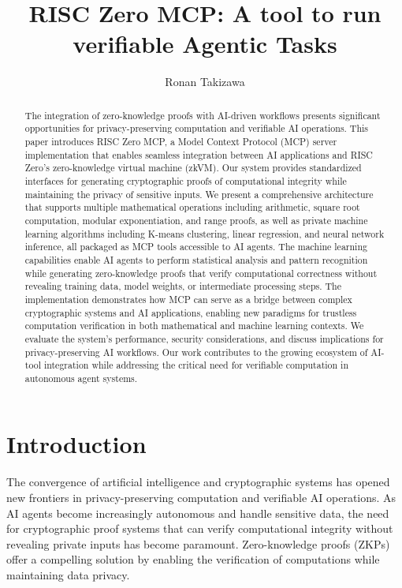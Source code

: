 \documentclass[11pt]{article}
\begin{document}
\title{RISC Zero MCP: A tool to run verifiable Agentic Tasks}

\author{Ronan Takizawa}


\maketitle

\begin{abstract}
The integration of zero-knowledge proofs with AI-driven workflows presents significant opportunities for privacy-preserving computation and verifiable AI operations. This paper introduces RISC Zero MCP, a Model Context Protocol (MCP) server implementation that enables seamless integration between AI applications and RISC Zero's zero-knowledge virtual machine (zkVM). Our system provides standardized interfaces for generating cryptographic proofs of computational integrity while maintaining the privacy of sensitive inputs. We present a comprehensive architecture that supports multiple mathematical operations including arithmetic, square root computation, modular exponentiation, and range proofs, as well as private machine learning algorithms including K-means clustering, linear regression, and neural network inference, all packaged as MCP tools accessible to AI agents. The machine learning capabilities enable AI agents to perform statistical analysis and pattern recognition while generating zero-knowledge proofs that verify computational correctness without revealing training data, model weights, or intermediate processing steps. The implementation demonstrates how MCP can serve as a bridge between complex cryptographic systems and AI applications, enabling new paradigms for trustless computation verification in both mathematical and machine learning contexts. We evaluate the system's performance, security considerations, and discuss implications for privacy-preserving AI workflows. Our work contributes to the growing ecosystem of AI-tool integration while addressing the critical need for verifiable computation in autonomous agent systems.
\end{abstract}

\section{Introduction}

The convergence of artificial intelligence and cryptographic systems has opened new frontiers in privacy-preserving computation and verifiable AI operations. As AI agents become increasingly autonomous and handle sensitive data, the need for cryptographic proof systems that can verify computational integrity without revealing private inputs has become paramount. Zero-knowledge proofs (ZKPs) offer a compelling solution by enabling the verification of computations while maintaining data privacy.
\end{document}
